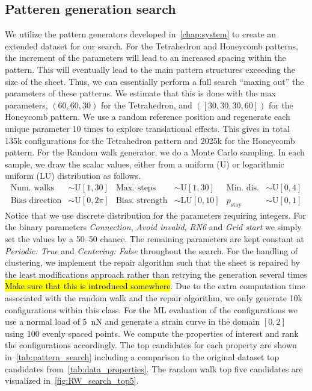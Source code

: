 \subsection{Patteren generation search}
We utilize the pattern generators developed in~\cref{chap:system} to create an extended dataset for our search. For the Tetrahedron and Honeycomb patterns, the increment of the parameters will lead to an increased spacing within the pattern. This will eventually lead to the main pattern structures exceeding the size of the sheet. Thus, we can essentially perform a full search ``maxing out'' the parameters of these patterns. We estimate
that this is done with the max parameters, $(60, 60, 30)$ for the Tetrahedron,
and $([30, 30, 30, 60])$ for the Honeycomb pattern. We use a random reference position
and regenerate each unique parameter 10 times to explore translational effects. This gives in total 135k configurations for the
Tetrahedron pattern and 2025k for the Honeycomb pattern. For the Random walk
generator, we do a Monte Carlo sampling. In each sample, we draw the scalar values, either from a uniform (U) or logarithmic uniform (LU) distribution as follows.
\begin{align*}
  \text{Num. walks} &\sim \text{U}[1, 30] & \text{Max. steps} &\sim \text{U}[1,30]  & \text{Min. dis.} &\sim \text{U}[0,4] \\
  \text{Bias direction} &\sim \text{U}[0, 2\pi] & \text{Bias. strength} &\sim \text{LU}[0,10]  & p_{\text{stay}} &\sim \text{U}[0,1]  
\end{align*}
Notice that we use discrete distribution for the parameters requiring integers.
For the binary parameters \textit{Connection}, \textit{Avoid invalid},
\textit{RN6} and \textit{Grid start} we simply set the values by a 50--50
chance. The remaining parameters are kept constant at \textit{Periodic: True}
and \textit{Centering: False} throughout the search. For the handling of
clustering, we implement the repair algorithm such that the sheet is repaired by
the least modifications approach rather than retrying the generation several
times \hl{Make sure that this is introduced somewhere}. Due to the extra
computation time associated with the random walk and the repair algorithm, we
only generate 10k configurations within this class. For the \acrshort{ML}
evaluation of the configurations we use a normal load of \SI{5}{nN} and generate
a strain curve in the domain $[0,2]$ using 100 evenly spaced points. We compute
the properties of interest and rank the configurations accordingly. The top
candidates for each property are shown in~\cref{tab:pattern_search} including a
comparison to the original dataset top candidates
from~\cref{tab:data_properties}. The random walk top five candidates are
visualized in~\cref{fig:RW_search_top5}.


